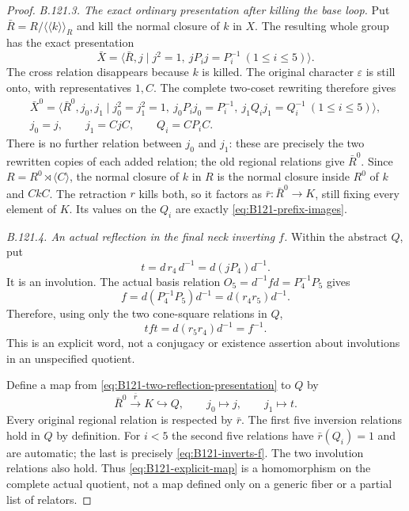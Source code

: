 \begin{proof}
\emph{B.121.3. The exact ordinary presentation after killing the base loop.}
Put $\bar R=R/\langle\!\langle k\rangle\!\rangle_R$ and
kill the normal closure of $k$ in $X$. The resulting whole group
has the exact presentation
\begin{equation}\label{eq:B121-killed-X}
 \bar X=\langle\bar R,j\mid j^2=1,
                    \ jP_i j=P_i^{-1}\ (1\leq i\leq5)\rangle.
\end{equation}
The cross relation disappears because $k$ is killed. The original
character $\varepsilon$ is still onto, with representatives
$1,C$. The complete two-coset rewriting therefore gives
\begin{equation}\label{eq:B121-two-reflection-presentation}
 \begin{gathered}
 \bar X^0=\langle\bar R^0,j_0,j_1\mid j_0^2=j_1^2=1,
       \ j_0P_i j_0=P_i^{-1},\ j_1Q_i j_1=Q_i^{-1}
                                      \ (1\leq i\leq5)\rangle,\\
 j_0=j,\qquad j_1=CjC,\qquad Q_i=CP_iC.
 \end{gathered}
\end{equation}
There is no further relation between $j_0$ and $j_1$: these
are precisely the two rewritten copies of each added relation;
the old regional relations give $\bar R^0$.
Since $R=R^0\rtimes\langle C\rangle$, the normal closure of
$k$ in $R$ is the normal closure inside $R^0$ of $k$ and $CkC$.
The retraction $r$ kills both, so it factors as
$\bar r:\bar R^0\to K$, still fixing every element of $K$.
Its values on the $Q_i$ are exactly
\eqref{eq:B121-prefix-images}.

\emph{B.121.4. An actual reflection in the final neck inverting $f$.}
Within the abstract $Q$, put
\begin{equation}\label{eq:B121-inverting-reflection}
 t=d\,r_4\,d^{-1}=d(jP_4)d^{-1}.
\end{equation}
It is an involution. The actual basis relation
$O_5=d^{-1}fd=P_4^{-1}P_5$ gives
\[
 f=d(P_4^{-1}P_5)d^{-1}=d(r_4r_5)d^{-1}.
\]
Therefore, using only the two cone-square relations in $Q$,
\begin{equation}\label{eq:B121-inverts-f}
 tft=d(r_5r_4)d^{-1}=f^{-1}.
\end{equation}
This is an explicit word, not a conjugacy or existence assertion
about involutions in an unspecified quotient.

Define a map from \eqref{eq:B121-two-reflection-presentation}
to $Q$ by
\begin{equation}\label{eq:B121-explicit-map}
 \bar R^0\xrightarrow{\bar r}K\hookrightarrow Q,
 \qquad j_0\longmapsto j,\qquad j_1\longmapsto t.
\end{equation}
Every original regional relation is respected by $\bar r$.
The first five inversion relations hold in $Q$ by definition.
For $i<5$ the second five relations have $\bar r(Q_i)=1$
and are automatic; the last is precisely
\eqref{eq:B121-inverts-f}. The two involution relations also
hold. Thus \eqref{eq:B121-explicit-map} is a homomorphism on
the complete actual quotient, not a map defined only on a
generic fiber or a partial list of relators.


\end{proof}
